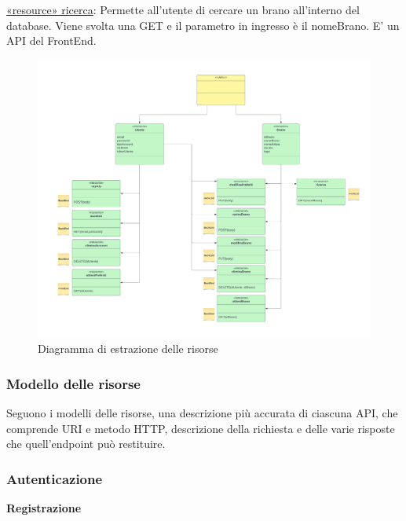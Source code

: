 \documentclass[a4paper,12pt]{article}
\begin{document}
\underline{«resource» ricerca}: Permette all’utente di cercare un brano all’interno del database. Viene svolta una GET e il parametro in ingresso è il nomeBrano. E’ un API del FrontEnd.

\begin{figure}[htp]
    \centering
    \includegraphics[width=\textwidth]{diagrams/resource-extraction.png}
    \caption{Diagramma di estrazione delle risorse}
\end{figure}

\subsubsection{Modello delle risorse}

Seguono i modelli delle risorse, una descrizione più accurata di ciascuna API, che comprende URI e metodo HTTP, descrizione della richiesta e delle varie risposte che quell'endpoint può restituire.

\subsubsection*{Autenticazione}

\textbf{Registrazione}
\end{document}

